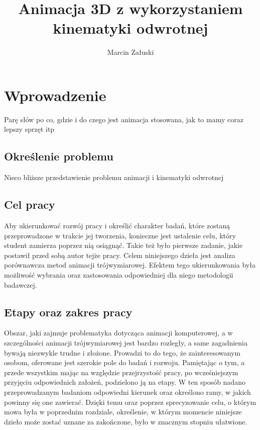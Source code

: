 \documentclass[11pt]{mwrep}
\author{Marcin Załuski}
\title{Animacja 3D z wykorzystaniem kinematyki odwrotnej}
\begin{document}
\maketitle
\tableofcontents

\chapter{Wprowadzenie}

Parę słów po co, gdzie i do czego jest animacja stosowana, jak to mamy coraz lepszy sprzęt itp

  \section{Określenie problemu}

  Nieco bliższe przedstawienie problemu animacji i kinematyki odwrotnej

  \section{Cel pracy}
  Aby ukierunkować rozwój pracy i określić charakter badań, które zostaną przeprowadzone w trakcie jej tworzenia, konieczne jest ustalenie celu, który student zamierza poprzez nią osiągnąć. Takie też było pierwsze zadanie, jakie postawił przed sobą autor tejże pracy. Celem niniejszego dzieła jest analiza porównawcza metod animacji trójwymiarowej. Efektem tego ukierunkowania była możliwość wybrania oraz zastosowania odpowiedniej dla niego metodologii badawczej.

  \section{Etapy oraz zakres pracy}

  Obszar, jaki zajmuje problematyka dotycząca animacji komputerowej, a w szczególności animacji trójwymiarowej jest bardzo rozległy, a same zagadnienia bywają niezwykle trudne i złożone. Prowadzi to do tego, że zainteresowanym osobom, oferowane jest szerokie pole do badań i rozwoju. Pamiętając o tym, a przede wszystkim mając na względzie przejrzystość pracy, po wcześniejszym przyjęciu odpowiednich założeń, podzielono ją na etapy. W ten sposób nadano przeprowadzanym badaniom odpowiedni kierunek oraz określono ramy, w jakich powinny się one zawierać. Dzięki temu oraz poprzez sprecyzowanie celu, o którym mowa była w poprzednim rozdziale, określenie, w którym momencie niniejsze dzieło może zostać uznane za zakończone, było w znacznym stopniu ułatwione.
  
\end{document}
